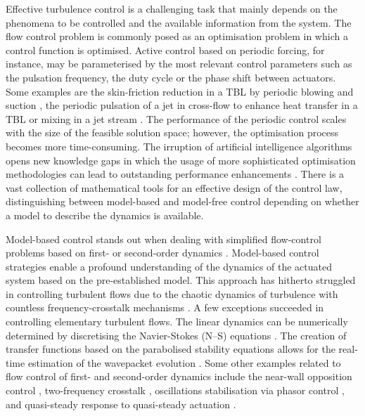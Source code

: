 Effective turbulence control is a challenging task that mainly depends on the phenomena to be controlled and the available information from the system. The flow control problem is commonly posed as an optimisation problem in which a control function is optimised. Active control based on periodic forcing, for instance, may be parameterised by the most relevant control parameters such as the pulsation frequency, the duty cycle or the phase shift between actuators. Some examples are the skin-friction reduction in a TBL by periodic blowing and suction \citep{cheng2021skin}, the periodic pulsation of a jet in cross-flow to enhance heat transfer in a TBL \citep{Castellanos2022slotjet} or mixing in a jet stream \citep{Fan2017jetcontrol}. The performance of the periodic control scales with the size of the feasible solution space; however, the optimisation process becomes more time-consuming. The irruption of artificial intelligence algorithms opens new knowledge gaps in which the usage of more sophisticated optimisation methodologies can lead to outstanding performance enhancements \citep{Noack2019control}. There is a vast collection of mathematical tools for an effective design of the control law, distinguishing between model-based and model-free control depending on whether a model to describe the dynamics is available.

Model-based control stands out when dealing with simplified flow-control problems based on first- or second-order dynamics \citep{Rowley2006control}. Model-based control strategies enable a profound understanding of the dynamics of the actuated system based on the pre-established model. This approach has hitherto struggled in controlling turbulent flows due to the chaotic dynamics of turbulence with countless frequency-crosstalk mechanisms \citep{BruntonNoack2015review}. A few exceptions succeeded in controlling elementary turbulent flows. The linear dynamics can be numerically determined by discretising the Navier-Stokes (N–S) equations  \citep{Kim2007linearcontrol,Sipp2010linearcontrol}. %
The creation of transfer functions based on the parabolised stability equations allows for the real-time estimation of the wavepacket evolution \citep{sasaki2017wavepackets}. 
Some other examples related to flow control of first- and second-order dynamics include the near-wall opposition control \citep{Choi1994,Fukagata2003oppcontrol},  two-frequency crosstalk \citep{Glezer2005control,luchtenburg2009galerkin}, oscillations stabilisation via phasor control \citep{pastoor2008control}, and quasi-steady response to quasi-steady actuation \citep{Pfeiffer2018robustcontrol}.

